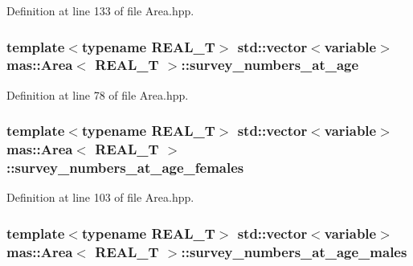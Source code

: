 Definition at line 133 of file Area.\-hpp.

\hypertarget{structmas_1_1_area_ab8802451bd599039ee254b6737e8fad9}{
\subsubsection[{survey\-\_\-numbers\-\_\-at\-\_\-age}]{\setlength{\rightskip}{0pt plus 5cm}template$<$typename R\-E\-A\-L\-\_\-\-T$>$ std\-::vector$<${\bf variable}$>$ {\bf mas\-::\-Area}$<$ R\-E\-A\-L\-\_\-\-T $>$\-::survey\-\_\-numbers\-\_\-at\-\_\-age}}\label{structmas_1_1_area_ab8802451bd599039ee254b6737e8fad9}


Definition at line 78 of file Area.\-hpp.

\hypertarget{structmas_1_1_area_a5c4aa87c77904d0ea7b60aad5cf5e852}{
\subsubsection[{survey\-\_\-numbers\-\_\-at\-\_\-age\-\_\-females}]{\setlength{\rightskip}{0pt plus 5cm}template$<$typename R\-E\-A\-L\-\_\-\-T$>$ std\-::vector$<${\bf variable}$>$ {\bf mas\-::\-Area}$<$ R\-E\-A\-L\-\_\-\-T $>$\-::survey\-\_\-numbers\-\_\-at\-\_\-age\-\_\-females}}\label{structmas_1_1_area_a5c4aa87c77904d0ea7b60aad5cf5e852}


Definition at line 103 of file Area.\-hpp.

\hypertarget{structmas_1_1_area_ae6160129e74d4b173cb755976835d162}{
\subsubsection[{survey\-\_\-numbers\-\_\-at\-\_\-age\-\_\-males}]{\setlength{\rightskip}{0pt plus 5cm}template$<$typename R\-E\-A\-L\-\_\-\-T$>$ std\-::vector$<${\bf variable}$>$ {\bf mas\-::\-Area}$<$ R\-E\-A\-L\-\_\-\-T $>$\-::survey\-\_\-numbers\-\_\-at\-\_\-age\-\_\-males}}\label{structmas_1_1_area_ae6160129e74d4b173cb755976835d162}


